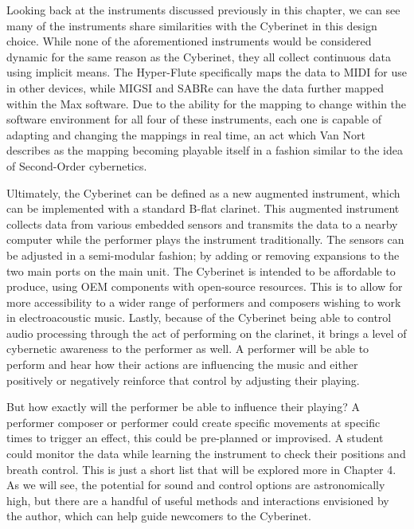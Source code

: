 Looking back at the instruments discussed previously in this chapter, we can see many of the instruments share similarities with the Cyberinet in this design choice. While none of the aforementioned instruments would be considered dynamic for the same reason as the Cyberinet, they all collect continuous data using implicit means. The Hyper-Flute specifically maps the data to MIDI for use in other devices, while MIGSI and SABRe can have the data further mapped within the Max software. Due to the ability for the mapping to change within the software environment for all four of these instruments, each one is capable of adapting and changing the mappings in real time, an act which Van Nort describes as the mapping becoming playable itself\cite{vanNortMapping2007} in a fashion similar to the idea of Second-Order cybernetics.



Ultimately, the Cyberinet can be defined as a new augmented instrument, which can be implemented with a standard B-flat clarinet. This augmented instrument collects data from various embedded sensors and transmits the data to a nearby computer while the performer plays the instrument traditionally. The sensors can be adjusted in a semi-modular fashion; by adding or removing expansions to the two main ports on the main unit. The Cyberinet is intended to be affordable to produce, using OEM components with open-source resources. This is to allow for more accessibility to a wider range of performers and composers wishing to work in electroacoustic music. Lastly, because of the Cyberinet being able to control audio processing through the act of performing on the clarinet, it brings a level of cybernetic awareness to the performer as well. A performer will be able to perform and hear how their actions are influencing the music and either positively or negatively reinforce that control by adjusting their playing. 

But how exactly will the performer be able to influence their playing? A performer composer or performer could create specific movements at specific times to trigger an effect, this could be pre-planned or improvised. A student could monitor the data while learning the instrument to check their positions and breath control. This is just a short list that will be explored more in Chapter 4. As we will see, the potential for sound and control options are astronomically high, but there are a handful of useful methods and interactions envisioned by the author, which can help guide newcomers to the Cyberinet.



